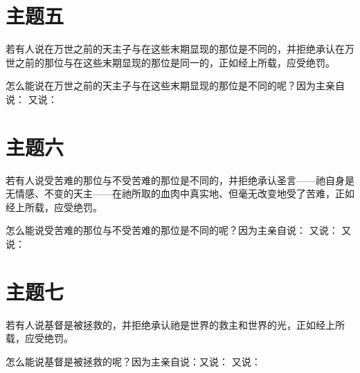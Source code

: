 \section{主题五}

若有人说在万世之前的天主子与在这些末期显现的那位是不同的，并拒绝承认在万世之前的那位与在这些末期显现的那位是同一的，正如经上所载，应受绝罚。\par

\par

怎么能说在万世之前的天主子与在这些末期显现的那位是不同的呢？因为主亲自说： 又说：\par


\section{主题六}

若有人说受苦难的那位与不受苦难的那位是不同的，并拒绝承认圣言——祂自身是无情感、不变的天主——在祂所取的血肉中真实地、但毫无改变地受了苦难，正如经上所载，应受绝罚。\par

\par

怎么能说受苦难的那位与不受苦难的那位是不同的呢？因为主亲自说： 又说： 又说：\par


\section{主题七}

若有人说基督是被拯救的，并拒绝承认祂是世界的救主和世界的光，正如经上所载，应受绝罚。\par

\par

怎么能说基督是被拯救的呢？因为主亲自说：又说： 又说：\par

